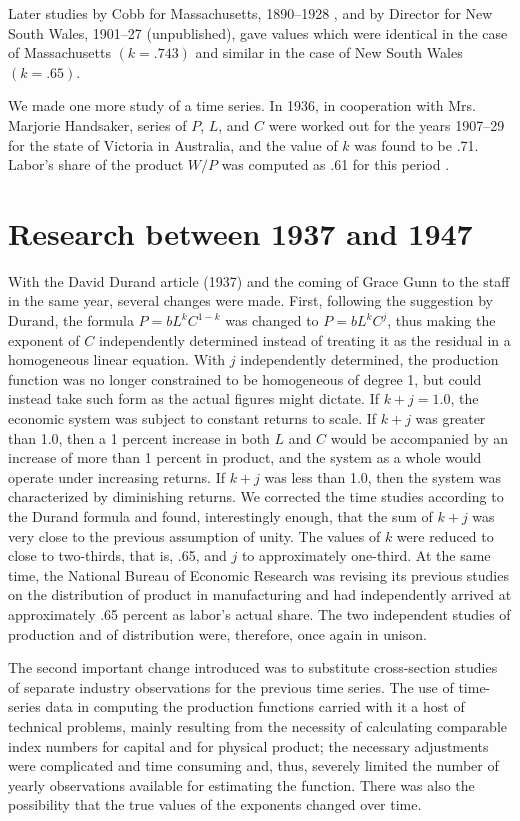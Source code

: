 \documentclass{article}
\begin{document}
Later studies by Cobb for Massachusetts, 1890--1928 \cite{Cobb:1}, and by Director for New South Wales, 1901--27 (unpublished), gave values which were identical in the case of Massachusetts \((k = .743)\) and similar in the case of New South Wales \((k = .65)\).

We made one more study of a time series. In 1936, in cooperation with Mrs. Marjorie Handsaker, series of \(P\), \(L\), and \(C\) were worked out for the years 1907--29 for the state of Victoria in Australia, and the value of \(k\) was found to be .71. Labor's share of the product \(W/P\) was computed as .61 for this period \cite{Douglas:6}.

\section*{Research between 1937 and 1947}

With the David Durand article (1937) and the coming of Grace Gunn to the staff in the same year, several changes were made. First, following the suggestion by Durand, the formula \(P=bL^kC^{1-k}\) was changed to \(P=bL^kC^j\), thus making the exponent of \(C\) independently determined instead of treating it as the residual in a homogeneous linear equation. With \(j\) independently determined, the production function was no longer constrained to be homogeneous of degree 1, but could instead take such form as the actual figures might dictate. If \(k + j = 1.0\), the economic system was subject to constant returns to scale. If \(k + j\) was greater than 1.0, then a 1 percent increase in both \(L\) and \(C\) would be accompanied by an increase of more than 1 percent in product, and the system as a %
whole would operate under increasing returns. If \(k + j\) was less than 1.0, then the system was characterized by diminishing returns. We corrected the time studies according to the Durand formula and found, interestingly enough, that the sum of \(k + j\) was very close to the previous assumption of unity. The values of \(k\) were reduced to close to two-thirds, that is, .65, and \(j\) to approximately one-third. At the same time, the National Bureau of Economic Research was revising its previous studies on the distribution of product in manufacturing and had independently arrived at approximately .65 percent as labor's actual share. The two independent studies of production and of distribution were, therefore, once again in unison.

The second important change introduced was to substitute cross-section studies of separate industry observations for the previous time series. The use of time-series data in computing the production functions carried with it a host of technical problems, mainly resulting from the necessity of calculating comparable index numbers for capital and for physical product; the necessary adjustments were complicated and time consuming and, thus, severely limited the number of yearly observations available for estimating the function. There was also the possibility that the true values of the exponents changed over time.
\end{document}

